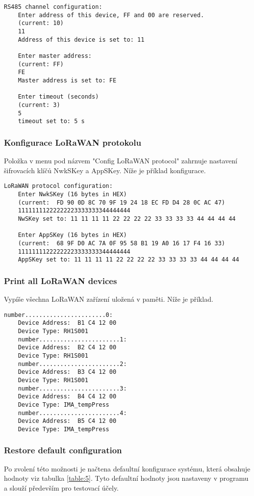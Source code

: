 \begin{lstlisting}[style=log]
    RS485 channel configuration:
    Enter address of this device, FF and 00 are reserved.
    (current: 10)
    11
    Address of this device is set to: 11

    Enter master address: 
    (current: FF)
    FE
    Master address is set to: FE

    Enter timeout (seconds)
    (current: 3)
    5
    timeout set to: 5 s
\end{lstlisting}


\subsubsection{Konfigurace LoRaWAN protokolu}
Položka v menu pod názvem "Config LoRaWAN protocol" zahrnuje nastavení šifrovacích klíčů NwkSKey a AppSKey. Níže je příklad konfigurace.

\begin{lstlisting}[style=log]    
    LoRaWAN protocol configuration:
    Enter NwkSKey (16 bytes in HEX)
    (current:  FD 90 0D 8C 70 9F 19 24 18 EC FD D4 28 0C AC 47)
    11111111222222223333333344444444
    NwSKey set to: 11 11 11 11 22 22 22 22 33 33 33 33 44 44 44 44

    Enter AppSKey (16 bytes in HEX)
    (current:  68 9F D0 AC 7A 0F 95 58 B1 19 A0 16 17 F4 16 33)
    11111111222222223333333344444444
    AppSKey set to: 11 11 11 11 22 22 22 22 33 33 33 33 44 44 44 44
\end{lstlisting}


\subsubsection{Print all LoRaWAN devices}
Vypíše všechna LoRaWAN zařízení uložená v paměti. Níže je příklad.

\begin{lstlisting}[style=log]    
    number.......................0:
    Device Address:  B1 C4 12 00
    Device Type: RH1S001
    number.......................1:
    Device Address:  B2 C4 12 00
    Device Type: RH1S001
    number.......................2:
    Device Address:  B3 C4 12 00
    Device Type: RH1S001
    number.......................3:
    Device Address:  B4 C4 12 00
    Device Type: IMA_tempPress
    number.......................4:
    Device Address:  B5 C4 12 00
    Device Type: IMA_tempPress
\end{lstlisting}


\subsubsection{Restore default configuration}
Po zvolení této možnosti je načtena defaultní konfigurace systému, která obsahuje hodnoty viz tabulka \ref{table:5}. Tyto defaultní hodnoty jsou nastaveny v programu a slouží především pro testovací účely.

